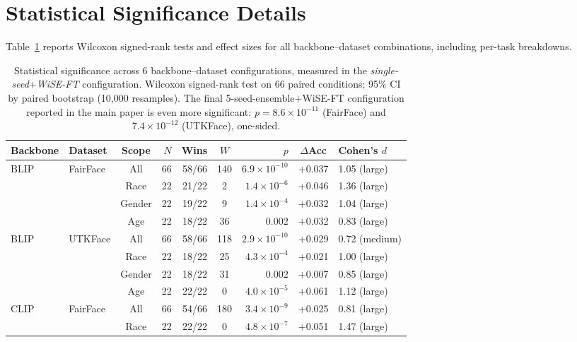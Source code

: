 
\section{Statistical Significance Details}
\label{app:stats}

Table~\ref{tab:app_significance} reports Wilcoxon signed-rank tests and effect sizes for all backbone--dataset combinations, including per-task breakdowns.

\begin{table}[tbp]
\centering
\caption{Statistical significance across 6 backbone--dataset configurations, measured in the \emph{single-seed$+$WiSE-FT} configuration. Wilcoxon signed-rank test on 66 paired conditions; 95\% CI by paired bootstrap (10,000 resamples). The final 5-seed-ensemble$+$WiSE-FT configuration reported in the main paper is even more significant: $p{=}8.6{\times}10^{-11}$ (FairFace) and $7.4{\times}10^{-12}$ (UTKFace), one-sided.}
\label{tab:app_significance}
\small
\begin{tabular}{llcrrcrcl}
\toprule
Backbone & Dataset & Scope & $N$ & Wins & $W$ & $p$ & $\Delta$Acc & Cohen's $d$ \\
\midrule
BLIP & FairFace & All & 66 & 58/66 & 140 & $6.9{\times}10^{-10}$ & +0.037 & 1.05 (large) \\
 & & Race & 22 & 21/22 & 2 & $1.4{\times}10^{-6}$ & +0.046 & 1.36 (large) \\
 & & Gender & 22 & 19/22 & 9 & $1.4{\times}10^{-4}$ & +0.032 & 1.04 (large) \\
 & & Age & 22 & 18/22 & 36 & $0.002$ & +0.032 & 0.83 (large) \\
\midrule
BLIP & UTKFace & All & 66 & 58/66 & 118 & $2.9{\times}10^{-10}$ & +0.029 & 0.72 (medium) \\
 & & Race & 22 & 18/22 & 25 & $4.3{\times}10^{-4}$ & +0.021 & 1.00 (large) \\
 & & Gender & 22 & 18/22 & 31 & $0.002$ & +0.007 & 0.85 (large) \\
 & & Age & 22 & 22/22 & 0 & $4.0{\times}10^{-5}$ & +0.061 & 1.12 (large) \\
\midrule
CLIP & FairFace & All & 66 & 54/66 & 180 & $3.4{\times}10^{-9}$ & +0.025 & 0.81 (large) \\
 & & Race & 22 & 22/22 & 0 & $4.8{\times}10^{-7}$ & +0.051 & 1.47 (large) \\

\end{tabular}
\end{table}
